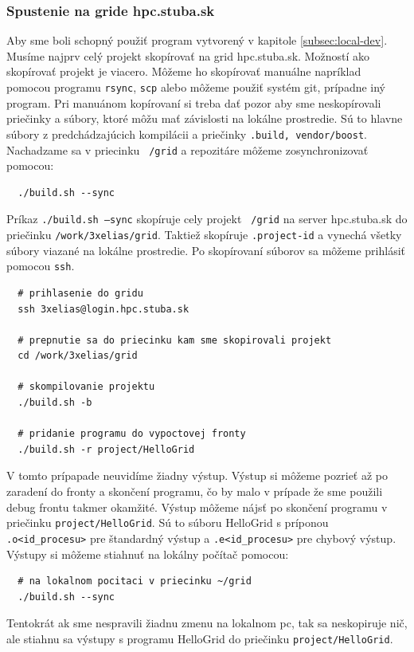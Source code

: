 \subsubsection{Spustenie na gride hpc.stuba.sk}
Aby sme boli schopný použiť program vytvorený v kapitole \ref{subsec:local-dev}. Musíme najprv celý projekt skopírovať na grid hpc.stuba.sk.
Možností ako skopírovať projekt je viacero. Môžeme ho skopírovať manuálne napríklad pomocou programu \texttt{rsync}, \texttt{scp}
alebo môžeme použiť systém git, prípadne iný program.
Pri manuánom kopírovaní si treba dať pozor aby sme neskopírovali priečinky a súbory, ktoré môžu mať závislosti na lokálne prostredie.
Sú to hlavne súbory z predchádzajúcich kompilácii a priečinky \texttt{.build, vendor/boost}.
Nachadzame sa v priecinku \texttt{~/grid} a repozitáre môžeme zosynchronizovať pomocou: 
\begin{lstlisting}
  ./build.sh --sync
\end{lstlisting}
Príkaz \texttt{./build.sh --sync} skopíruje cely projekt \texttt{~/grid} na server hpc.stuba.sk do priečinku \texttt{/work/3xelias/grid}.
Taktiež skopíruje \texttt{.project-id} a vynechá všetky súbory viazané na lokálne prostredie.
Po skopírovaní súborov sa môžeme prihlásiť pomocou \texttt{ssh}.
\begin{lstlisting}
  # prihlasenie do gridu
  ssh 3xelias@login.hpc.stuba.sk

  # prepnutie sa do priecinku kam sme skopirovali projekt
  cd /work/3xelias/grid

  # skompilovanie projektu
  ./build.sh -b

  # pridanie programu do vypoctovej fronty
  ./build.sh -r project/HelloGrid
\end{lstlisting}
V tomto prípapade neuvidíme žiadny výstup. Výstup si môžeme pozrieť až po zaradení do fronty a skončení programu, čo by malo v prípade že sme použili
debug frontu takmer okamžité. Výstup môžeme nájsť po skončení programu v priečinku \texttt{project/HelloGrid}. 
Sú to súboru HelloGrid s príponou \texttt{.o<id\_procesu>} pre štandardný výstup a \texttt{.e<id\_procesu>} pre chybový výstup.
Výstupy si môžeme stiahnuť na lokálny počítač pomocou:
\begin{lstlisting}
  # na lokalnom pocitaci v priecinku ~/grid
  ./build.sh --sync
\end{lstlisting}
Tentokrát ak sme nespravili žiadnu zmenu na lokalnom pc, tak sa neskopiruje nič,
ale stiahnu sa výstupy s programu HelloGrid do priečinku \texttt{project/HelloGrid}.


